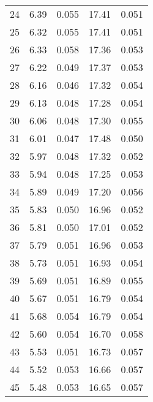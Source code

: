 \begin{table}
\begin{tabular}{c|ll|ll}
24 & 6.39 & 0.055 & 17.41 & 0.051 \\
25 & 6.32 & 0.055 & 17.41 & 0.051 \\
26 & 6.33 & 0.058 & 17.36 & 0.053 \\
27 & 6.22 & 0.049 & 17.37 & 0.053 \\
28 & 6.16 & 0.046 & 17.32 & 0.054 \\
29 & 6.13 & 0.048 & 17.28 & 0.054 \\
30 & 6.06 & 0.048 & 17.30 & 0.055 \\
31 & 6.01 & 0.047 & 17.48 & 0.050 \\
32 & 5.97 & 0.048 & 17.32 & 0.052 \\
33 & 5.94 & 0.048 & 17.25 & 0.053 \\
34 & 5.89 & 0.049 & 17.20 & 0.056 \\
35 & 5.83 & 0.050 & 16.96 & 0.052 \\
36 & 5.81 & 0.050 & 17.01 & 0.052 \\
37 & 5.79 & 0.051 & 16.96 & 0.053 \\
38 & 5.73 & 0.051 & 16.93 & 0.054 \\
39 & 5.69 & 0.051 & 16.89 & 0.055 \\
40 & 5.67 & 0.051 & 16.79 & 0.054 \\
41 & 5.68 & 0.054 & 16.79 & 0.054 \\
42 & 5.60 & 0.054 & 16.70 & 0.058 \\
43 & 5.53 & 0.051 & 16.73 & 0.057 \\
44 & 5.52 & 0.053 & 16.66 & 0.057 \\
45 & 5.48 & 0.053 & 16.65 & 0.057 \\
               \hline
        \end{tabular}
    \end{table}
    \clearpage

